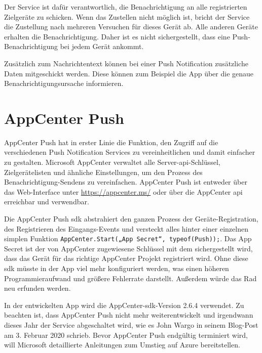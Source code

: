 Der Service ist dafür verantwortlich, die Benachrichtigung an alle registrierten Zielgeräte zu schicken.
Wenn das Zustellen nicht möglich ist, bricht der Service die Zustellung nach mehreren Versuchen für dieses Gerät ab.
Alle anderen Geräte erhalten die Benachrichtigung.
Daher ist es nicht sichergestellt, dass eine Push-Benachrichtigung bei jedem Gerät ankommt.\par

Zusätzlich zum Nachrichtentext können bei einer Push Notification zusätzliche Daten mitgeschickt werden. Diese können zum Beispiel die App über die genaue Benachrichtigungsursache informieren.

\section{AppCenter Push}
AppCenter Push hat in erster Linie die Funktion, den Zugriff auf die verschiedenen Push Notification Services zu vereinheitlichen und damit einfacher zu gestalten.
Microsoft AppCenter verwaltet alle Server-\ac{api}-Schlüssel, Zielgerätelisten und ähnliche Einstellungen, um den Prozess des Benachrichtigung-Sendens zu vereinfachen.
AppCenter Push ist entweder über das Web-Interface unter \url{https://appcenter.ms/} oder über die AppCenter \ac{api} erreichbar und verwendbar.\par

Die AppCenter Push \ac{sdk} abstrahiert den ganzen Prozess der Geräte-Registration, des Registrieren des Eingangs-Events und versteckt alles hinter einer einzelnen simplen Funktion \texttt{AppCenter.Start(„{App Secret}“, typeof(Push));}. Das App Secret ist der von AppCenter zugewiesene Schlüssel mit dem sichergestellt wird, dass das Gerät für das richtige AppCenter Projekt registriert wird.
Ohne diese \ac{sdk} müsste in der App viel mehr konfiguriert werden, was einen höheren Programmieraufwand und größere Fehlerrate darstellt. Außerdem würde das Rad neu erfunden werden.\par

In der entwickelten App wird die AppCenter-\ac{sdk}-Version 2.6.4 verwendet. Zu beachten ist, dass AppCenter Push nicht mehr weiterentwickelt und irgendwann dieses Jahr der Service abgeschaltet wird, wie es John Wargo in seinem Blog-Post am 3. Februar 2020 schrieb. Bevor AppCenter Push endgültig terminiert wird, will Microsoft detaillierte Anleitungen zum Umstieg auf Azure bereitstellen.